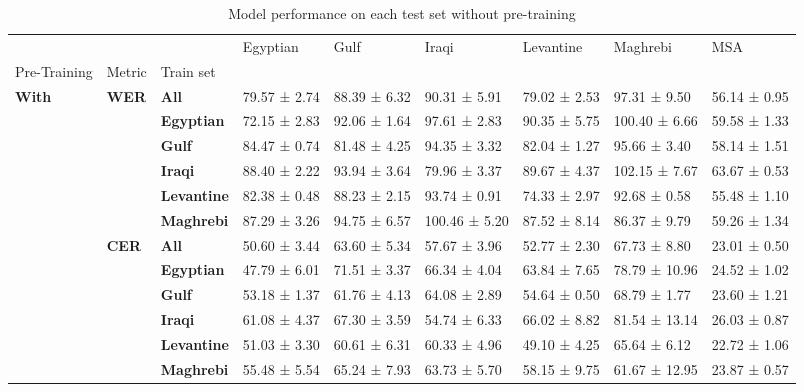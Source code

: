 \begin{table}
\caption{Model performance on each test set without pre-training}
\label{tab:all_res}
\begin{tabular}{lllllllll}
\toprule
 &  &  & Egyptian & Gulf & Iraqi & Levantine & Maghrebi & MSA \\
Pre-Training & Metric & Train set &  &  &  &  &  &  \\
\midrule
\multirow[t]{12}{*}{\textbf{With}} & \multirow[t]{6}{*}{\textbf{WER}} & \textbf{All} & 79.57 ± 2.74 & 88.39 ± 6.32 & 90.31 ± 5.91 & 79.02 ± 2.53 & 97.31 ± 9.50 & 56.14 ± 0.95 \\
\textbf{} & \textbf{} & \textbf{Egyptian} & 72.15 ± 2.83 & 92.06 ± 1.64 & 97.61 ± 2.83 & 90.35 ± 5.75 & 100.40 ± 6.66 & 59.58 ± 1.33 \\
\textbf{} & \textbf{} & \textbf{Gulf} & 84.47 ± 0.74 & 81.48 ± 4.25 & 94.35 ± 3.32 & 82.04 ± 1.27 & 95.66 ± 3.40 & 58.14 ± 1.51 \\
\textbf{} & \textbf{} & \textbf{Iraqi} & 88.40 ± 2.22 & 93.94 ± 3.64 & 79.96 ± 3.37 & 89.67 ± 4.37 & 102.15 ± 7.67 & 63.67 ± 0.53 \\
\textbf{} & \textbf{} & \textbf{Levantine} & 82.38 ± 0.48 & 88.23 ± 2.15 & 93.74 ± 0.91 & 74.33 ± 2.97 & 92.68 ± 0.58 & 55.48 ± 1.10 \\
\textbf{} & \textbf{} & \textbf{Maghrebi} & 87.29 ± 3.26 & 94.75 ± 6.57 & 100.46 ± 5.20 & 87.52 ± 8.14 & 86.37 ± 9.79 & 59.26 ± 1.34 \\
\cline{2-9}
\textbf{} & \multirow[t]{6}{*}{\textbf{CER}} & \textbf{All} & 50.60 ± 3.44 & 63.60 ± 5.34 & 57.67 ± 3.96 & 52.77 ± 2.30 & 67.73 ± 8.80 & 23.01 ± 0.50 \\
\textbf{} & \textbf{} & \textbf{Egyptian} & 47.79 ± 6.01 & 71.51 ± 3.37 & 66.34 ± 4.04 & 63.84 ± 7.65 & 78.79 ± 10.96 & 24.52 ± 1.02 \\
\textbf{} & \textbf{} & \textbf{Gulf} & 53.18 ± 1.37 & 61.76 ± 4.13 & 64.08 ± 2.89 & 54.64 ± 0.50 & 68.79 ± 1.77 & 23.60 ± 1.21 \\
\textbf{} & \textbf{} & \textbf{Iraqi} & 61.08 ± 4.37 & 67.30 ± 3.59 & 54.74 ± 6.33 & 66.02 ± 8.82 & 81.54 ± 13.14 & 26.03 ± 0.87 \\
\textbf{} & \textbf{} & \textbf{Levantine} & 51.03 ± 3.30 & 60.61 ± 6.31 & 60.33 ± 4.96 & 49.10 ± 4.25 & 65.64 ± 6.12 & 22.72 ± 1.06 \\
\textbf{} & \textbf{} & \textbf{Maghrebi} & 55.48 ± 5.54 & 65.24 ± 7.93 & 63.73 ± 5.70 & 58.15 ± 9.75 & 61.67 ± 12.95 & 23.87 ± 0.57 \\
\cline{1-9} \cline{2-9}

\end{tabular}
\end{table}

